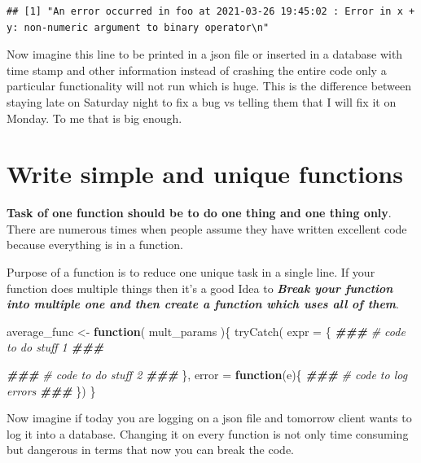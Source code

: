 \documentclass[
]{book}
\newenvironment{Shaded}{\begin{snugshade}}{\end{snugshade}}
\newcommand{\AttributeTok}[1]{\textcolor[rgb]{0.77,0.63,0.00}{#1}}
\newcommand{\CommentTok}[1]{\textcolor[rgb]{0.56,0.35,0.01}{\textit{#1}}}
\newcommand{\ControlFlowTok}[1]{\textcolor[rgb]{0.13,0.29,0.53}{\textbf{#1}}}
\newcommand{\DocumentationTok}[1]{\textcolor[rgb]{0.56,0.35,0.01}{\textbf{\textit{#1}}}}
\newcommand{\FunctionTok}[1]{\textcolor[rgb]{0.00,0.00,0.00}{#1}}
\newcommand{\NormalTok}[1]{#1}
\newcommand{\OtherTok}[1]{\textcolor[rgb]{0.56,0.35,0.01}{#1}}
\begin{document}
\begin{verbatim}
## [1] "An error occurred in foo at 2021-03-26 19:45:02 : Error in x + y: non-numeric argument to binary operator\n"
\end{verbatim}

Now imagine this line to be printed in a json file or inserted in a database with time stamp and other information instead of crashing the entire code only a particular functionality will not run which is huge. This is the difference between staying late on Saturday night to fix a bug vs telling them that I will fix it on Monday. To me that is big enough.

\hypertarget{write-simple-and-unique-functions}{%
\section{Write simple and unique functions}\label{write-simple-and-unique-functions}}

\textbf{Task of one function should be to do one thing and one thing only}. There are numerous times when people assume they have written excellent code because everything is in a function.

Purpose of a function is to reduce one unique task in a single line. If your function does multiple things then it's a good Idea to \textbf{\emph{Break your function into multiple one and then create a function which uses all of them}}.

\begin{Shaded}
\begin{Highlighting}[]
\NormalTok{average\_func }\OtherTok{\textless{}{-}} \ControlFlowTok{function}\NormalTok{( mult\_params )\{}
  \FunctionTok{tryCatch}\NormalTok{(}
    \AttributeTok{expr =}\NormalTok{ \{}
      \DocumentationTok{\#\#\#}
      \CommentTok{\# code to do stuff 1}
      \DocumentationTok{\#\#\#}
      
      \DocumentationTok{\#\#\#}
      \CommentTok{\# code to do stuff 2}
      \DocumentationTok{\#\#\#}
\NormalTok{    \},}
    \AttributeTok{error =} \ControlFlowTok{function}\NormalTok{(e)\{}
      \DocumentationTok{\#\#\#}
      \CommentTok{\# code to log errors}
      \DocumentationTok{\#\#\#}
\NormalTok{    \})}
\NormalTok{\}}
\end{Highlighting}
\end{Shaded}

Now imagine if today you are logging on a json file and tomorrow client wants to log it into a database. Changing it on every function is not only time consuming but dangerous in terms that now you can break the code.
\end{document}
